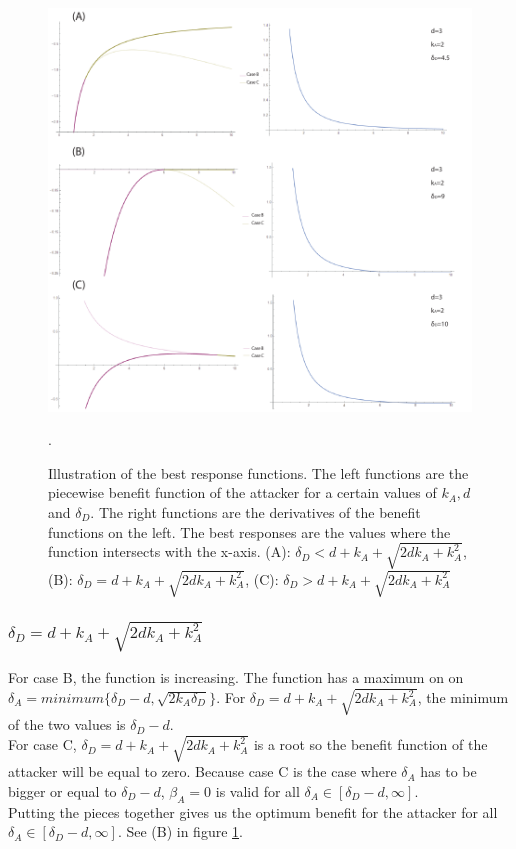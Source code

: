 \begin{figure}[hbtp]
\centering
\includegraphics[scale=1]{Images/case1A.pdf}
\caption{ Illustration of the best response functions. The left functions are the piecewise benefit function of the attacker for a certain values of $k_{A},d$ and $\delta_{D}$. The right functions are the derivatives of the benefit functions on the left. The best responses are the values where the function intersects with the x-axis. (A): $\delta_{D} < d+k_{A} + \sqrt{2dk_{A}+k_{A}^{2}}$, (B): $\delta_{D} = d+k_{A} + \sqrt{2dk_{A}+k_{A}^{2}}$, (C): $\delta_{D} > d+k_{A} + \sqrt{2dk_{A}+k_{A}^{2}}$}.
\label{case1A}
\end{figure}

\subsubsection*{$\delta_{D} = d+k_{A} + \sqrt{2dk_{A}+k_{A}^{2}}$} 
For case B, the function is increasing. The function has a maximum on on $\delta_{A} = minimum \{\delta_{D} -d, \sqrt{2k_{A}\delta_{D}} \} $. For $\delta_{D} = d+k_{A} + \sqrt{2dk_{A}+k_{A}^{2}}$, the minimum of the two values is $\delta_{D}-d$.\\
For case C, $\delta_{D} = d+k_{A} + \sqrt{2dk_{A}+k_{A}^{2}}$ is a root so the benefit function of the attacker will be equal to zero. Because case C is the case where $\delta_{A}$ has to be bigger or equal to $\delta_{D}-d$, $\beta_{A}=0$ is valid for all $\delta_{A} \in [\delta_{D}-d,\infty]$.\\
Putting the pieces together gives us the optimum benefit for the attacker for all $\delta_{A} \in [\delta_{D}-d,\infty]$. See (B) in figure \ref{case1A}.

